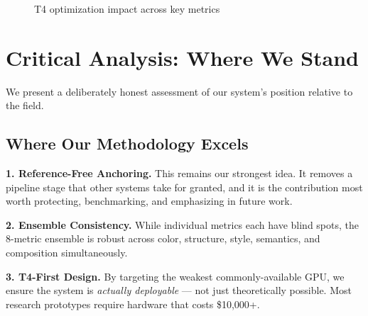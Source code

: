 \documentclass[11pt,a4paper,twocolumn]{article}
\begin{document}
\begin{figure}[H]
\centering
{}
\caption{T4 optimization impact across key metrics}
\label{fig:t4_impact}
\end{figure}

\section{Critical Analysis: Where We Stand}
\label{sec:analysis}

We present a deliberately honest assessment of our system's position relative to the field.

\subsection{Where Our Methodology Excels}

\textbf{1. Reference-Free Anchoring.} This remains our strongest idea. It removes a pipeline stage that other systems take for granted, and it is the contribution most worth protecting, benchmarking, and emphasizing in future work.

\textbf{2. Ensemble Consistency.} While individual metrics each have blind spots, the 8-metric ensemble is robust across color, structure, style, semantics, and composition simultaneously.

\textbf{3. T4-First Design.} By targeting the weakest commonly-available GPU, we ensure the system is \textit{actually deployable} --- not just theoretically possible. Most research prototypes require hardware that costs \$10,000+.
\end{document}
